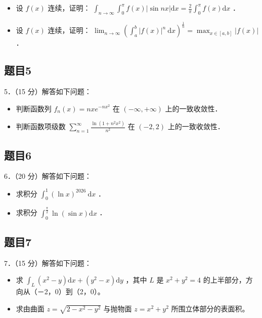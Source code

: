 \documentclass{article}
\begin{document}
\begin{itemize}
  \item[（1）] 设 \(f(x)\) 连续，证明： \(\int_{n \rightarrow \infty} \int_{0}^{\pi} f(x)|\sin n x| \mathrm{d} x=\frac{2}{\pi} \int_{0}^{\pi} f(x) \mathrm{d} x\) ．
  \item[（2）] 设 \(f(x)\) 连续，证明： \(\lim _{n \rightarrow \infty}\left(\int_{a}^{b}|f(x)|^{n} \mathrm{~d} x\right)^{\frac{1}{n}}=\max _{x \in[a, b]}|f(x)|\) ．
\end{itemize}

\subsection{题目5}
5．（15 分）解答如下问题：

\begin{itemize}
  \item[（1）] 判断函数列 \(f_{n}(x)=n x e^{-n x^{2}}\) 在 \((-\infty,+\infty)\) 上的一致收敛性．
  \item[（2）] 判断函数项级数 \(\sum_{n=1}^{\infty} \frac{\ln \left(1+n^{2} x^{2}\right)}{n^{2}}\) 在 \((-2,2)\) 上的一致收敛性．
\end{itemize}

\subsection{题目6}
6．（20 分）解答如下问题：

\begin{itemize}
  \item[（1）] 求积分 \(\int_{0}^{1}(\ln x)^{2026} \mathrm{~d} x\) ．
  \item[（2）] 求积分 \(\int_{0}^{\frac{\pi}{2}} \ln (\sin x) \mathrm{d} x\) ．
\end{itemize}

\subsection{题目7}
7．（15 分）解答如下问题：

\begin{itemize}
  \item[（1）] 求 \(\int_{L}\left(x^{2}-y\right) \mathrm{d} x+\left(y^{2}-x\right) \mathrm{d} y\) ，其中 \(L\) 是 \(x^{2}+y^{2}=4\) 的上半部分，方向从（－2，0）到（2，0）。
  \item[（2）] 求由曲面 \(z=\sqrt{2-x^{2}-y^{2}}\) 与抛物面 \(z=x^{2}+y^{2}\) 所围立体部分的表面积。
\end{itemize}
\end{document}
